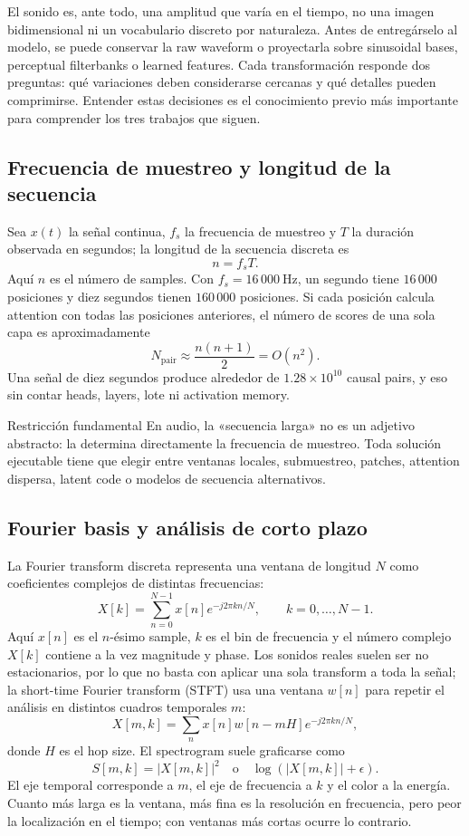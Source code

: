 \documentclass[a4paper]{article}
\begin{document}
El sonido es, ante todo, una amplitud que varía en el tiempo, no una imagen bidimensional ni un vocabulario discreto por naturaleza. Antes de entregárselo al modelo, se puede conservar la raw waveform o proyectarla sobre sinusoidal bases, perceptual filterbanks o learned features. Cada transformación responde dos preguntas: qué variaciones deben considerarse cercanas y qué detalles pueden comprimirse. Entender estas decisiones es el conocimiento previo más importante para comprender los tres trabajos que siguen.

\subsection{Frecuencia de muestreo y longitud de la secuencia}

Sea $x(t)$ la señal continua, $f_s$ la frecuencia de muestreo y $T$ la duración observada en segundos; la longitud de la secuencia discreta es
\[
n=f_sT.
\]
Aquí $n$ es el número de samples. Con $f_s=16\,000\ \mathrm{Hz}$, un segundo tiene $16\,000$ posiciones y diez segundos tienen $160\,000$ posiciones. Si cada posición calcula attention con todas las posiciones anteriores, el número de scores de una sola capa es aproximadamente
\[
N_{\mathrm{pair}}\approx \frac{n(n+1)}{2}=O(n^2).
\]
Una señal de diez segundos produce alrededor de $1.28\times10^{10}$ causal pairs, y eso sin contar heads, layers, lote ni activation memory.

\begin{importantbox}{Restricción fundamental}
En audio, la «secuencia larga» no es un adjetivo abstracto: la determina directamente la frecuencia de muestreo. Toda solución ejecutable tiene que elegir entre ventanas locales, submuestreo, patches, attention dispersa, latent code o modelos de secuencia alternativos.
\end{importantbox}

\subsection{Fourier basis y análisis de corto plazo}

La Fourier transform discreta representa una ventana de longitud $N$ como coeficientes complejos de distintas frecuencias:
\[
X[k]=\sum_{n=0}^{N-1}x[n]e^{-j2\pi kn/N},
\qquad k=0,\ldots,N-1.
\]
Aquí $x[n]$ es el $n$-ésimo sample, $k$ es el bin de frecuencia y el número complejo $X[k]$ contiene a la vez magnitude y phase. Los sonidos reales suelen ser no estacionarios, por lo que no basta con aplicar una sola transform a toda la señal; la short-time Fourier transform (STFT) usa una ventana $w[n]$ para repetir el análisis en distintos cuadros temporales $m$:
\[
X[m,k]=\sum_n x[n]w[n-mH]e^{-j2\pi kn/N},
\]
donde $H$ es el hop size. El spectrogram suele graficarse como
\[
S[m,k]=|X[m,k]|^2
\quad\text{o}\quad \log(|X[m,k]|+\epsilon).
\]
El eje temporal corresponde a $m$, el eje de frecuencia a $k$ y el color a la energía. Cuanto más larga es la ventana, más fina es la resolución en frecuencia, pero peor la localización en el tiempo; con ventanas más cortas ocurre lo contrario.
\end{document}
